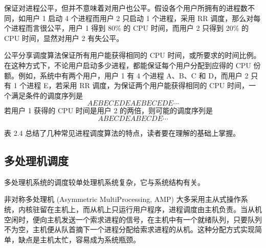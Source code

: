 \documentclass{ctexbook}
\begin{document}
	保证对进程公平，但并不意味着对用户也公平。假设各个用户所拥有的进程数不同，如用户 1 启动 4 个进程而用户 2 只启动 1 个进程，采用 RR 调度，那么对每个进程而言很公平，用户 1 得到 80\% 的 CPU 时间，而用户 2 只得到 20\% 的 CPU 时间，显然对用户 2 有失公平。
	
	公平分享调度算法保证所有用户能获得相同的 CPU 时间，或所要求的时间比例。在这种方式下，不论用户启动多少进程，都能保证每个用户分配到应得的 CPU 份额。例如，系统中有两个用户，用户 1 有 4 个进程 A、B、C 和 D，而用户 2 只有 1 个进程 E，若采用 RR 调度，为保证两个用户能获得相同的 CPU 时间，一个满足条件的调度序列是
	\[ AEBECEDEAEBECEDE \cdots \]
	若用户 1 获得的 CPU 时间是用户 2 的两倍，则可能的调度序列是
	\[ ABECDEABECDE \cdots \]
	
	表 2.4 总结了几种常见进程调度算法的特点，读者要在理解的基础上掌握。
	
	\begin{table}[h]
		\centering
		\caption{几种常见进程调度算法的特点}
		\label{tab:algorithm_features}
	\end{table}
	
	\subsection{多处理机调度}
	
	多处理机系统的调度较单处理机系统复杂，它与系统结构有关。
	
	非对称多处理机 (Asymmetric MultiProcessing, AMP) 大多采用主从式操作系统，内核驻留在主机上，而从机上只运行用户程序，进程调度由主机负责。当从机空闲时，便向主机发送一个索求进程的信号，在主机中有一个就绪队列，只要队列不为空，主机便从队首摘下一个进程分配给索求进程的从机。这种分配方式实现简单，缺点是主机太忙，容易成为系统瓶颈。
	
\end{document}
